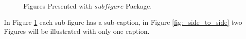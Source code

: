 \begin{figure}[htpb]
    \centering
    \hspace{.5cm}
    \caption{Figures Presented with $subfigure$ Package.}
    \label{fig:leon1}
\end{figure}\par
In Figure \ref{fig:leon1} each sub-figure has a sub-caption, in Figure \ref{fig:_side_to_side} two Figures will be illustrated with only one caption.
